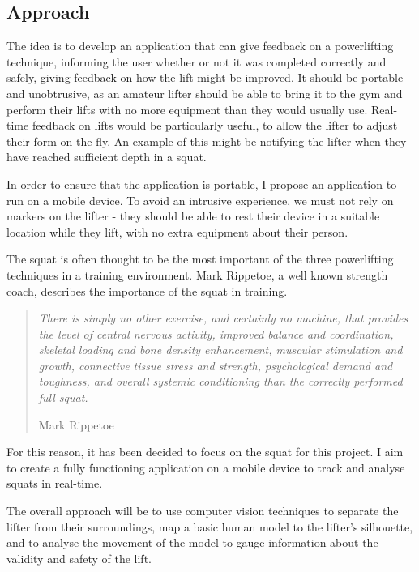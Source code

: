 \subsection{Approach}

The idea is to develop an application that can give feedback on a powerlifting technique, informing the user whether or not it was completed correctly and safely, giving feedback on how the lift might be improved. It should be portable and unobtrusive, as an amateur lifter should be able to bring it to the gym and perform their lifts with no more equipment than they would usually use. Real-time feedback on lifts would be particularly useful, to allow the lifter to adjust their form on the fly. An example of this might be notifying the lifter when they have reached sufficient depth in a squat.

In order to ensure that the application is portable, I propose an application to run on a mobile device. To avoid an intrusive experience, we must not rely on markers on the lifter - they should be able to rest their device in a suitable location while they lift, with no extra equipment about their person.

The squat is often thought to be the most important of the three powerlifting techniques in a training environment. Mark Rippetoe, a well known strength coach, describes the importance of the squat in training.

\begin{quote}
\emph{There is simply no other exercise, and certainly no machine, that provides the level of central nervous activity, improved balance and coordination, skeletal loading and bone density enhancement, muscular stimulation and growth, connective tissue stress and strength, psychological demand and toughness, and overall systemic conditioning than the correctly performed full squat.}

Mark Rippetoe
\end{quote}

For this reason, it has been decided to focus on the squat for this project. I aim to create a fully functioning application on a mobile device to track and analyse squats in real-time.

The overall approach will be to use computer vision techniques to separate the lifter from their surroundings, map a basic human model to the lifter's silhouette, and to analyse the movement of the model to gauge information about the validity and safety of the lift.

